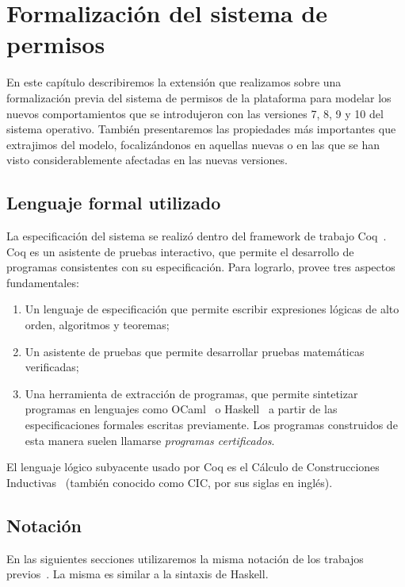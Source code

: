 \chapter{Formalización del sistema de permisos}
\label{chapter:formalization}

En este capítulo describiremos la extensión que realizamos sobre una formalización
previa\cite{luna-cleiej} del sistema de permisos de la plataforma para modelar los nuevos
comportamientos que se introdujeron con las versiones 7, 8, 9 y 10 del sistema operativo. También
presentaremos las propiedades más importantes que extrajimos del modelo, focalizándonos en aquellas
nuevas o en las que se han visto considerablemente afectadas en las nuevas versiones.


\section{Lenguaje formal utilizado}
\label{section:formalization:formal-language}
La especificación del sistema se realizó dentro del framework de trabajo Coq~\cite{coq}. Coq es un
asistente de pruebas interactivo, que permite el desarrollo de programas consistentes con su especificación.
Para lograrlo, provee tres aspectos fundamentales:
\begin{enumerate}
    \item Un lenguaje de especificación que permite escribir expresiones lógicas de alto orden, algoritmos y teoremas;
    \item Un asistente de pruebas que permite desarrollar pruebas matemáticas verificadas;
    \item Una herramienta de extracción de programas, que permite sintetizar programas en lenguajes
    como OCaml~\cite{ocaml} o Haskell~\cite{haskell} a partir de las especificaciones formales escritas
    previamente. Los programas construidos de esta manera suelen llamarse \textit{programas
    certificados}. 
\end{enumerate}

El lenguaje lógico subyacente usado por Coq es el Cálculo de Construcciones Inductivas~\cite{cic}
(también conocido como CIC, por sus siglas en inglés).

\section{Notación}
En las siguientes secciones  utilizaremos la misma notación de los trabajos
previos~\cite{luna-cleiej,betarte-2017,betarte-2016}. La misma es similar a la sintaxis de Haskell.

